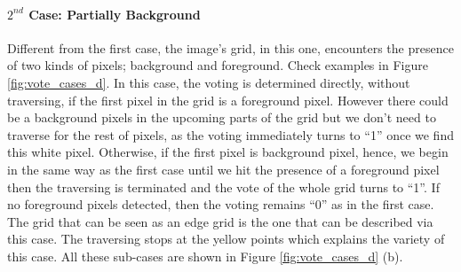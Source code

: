 \documentclass[12pt,fleqn]{book} %
\begin{document}
\paragraph{$2^{nd}$ Case: Partially Background}
Different from the first case, the image’s grid, in this one, encounters the presence of two kinds of pixels; background and foreground. Check examples in Figure \ref{fig:vote_cases_d}.
In this case, the voting is determined directly, without traversing, if the first pixel in the grid is a foreground pixel. However there could be a background pixels in the upcoming parts of the grid but we don’t need to traverse for the rest of pixels, as the voting immediately turns to “1” once we find this white pixel. Otherwise, if the first pixel is background pixel, hence, we begin in the same way as the first case until we hit the presence of a foreground pixel then the traversing is terminated and the vote of the whole grid turns to “1”. If no foreground pixels detected, then the voting remains “0” as in the first case. The grid that can be seen as an edge grid is the one that can be described via this case. The traversing stops at the yellow points which explains the variety of this case.
All these sub-cases are shown in Figure \ref{fig:vote_cases_d} (b).\bigskip
\end{document}

